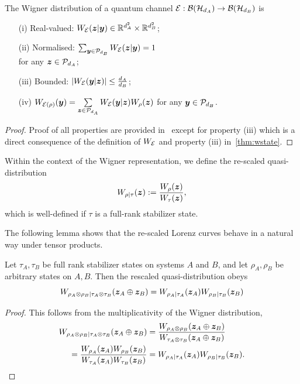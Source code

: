 \documentclass[pra,
aps,
twocolumn,
superscriptaddress,
groupedaddress,
nofootinbib,
reprint
]{revtex4-1}
\begin{document}
\begin{proposition}
    \label{thm:wchannel}
    The Wigner distribution of a quantum channel ${\mathcal E}: \mathcal{B}(\mathcal{H}_{d_A}) \rightarrow \mathcal{B}(\mathcal{H}_{d_B})$ is
    \begin{enumerate}
        \item[(i)]\label{en:wo1} Real-valued: $\W{\E}(\z|\y) \in \mathbb{R}^{d_A^2} \times \mathbb{R}^{d_B^2}$;
        \item[(ii)]\label{en:wo2} Normalised: $\sum_{\bmy \in \cal{P}_{d_B}} \W[\bmz|\bmy]{\E} = 1$ \\ 
        for any $\bm{z} \in \mathcal{P}_{d_A}$;
        \item[(iii)]\label{en:wo3} Bounded: $\abs{\W[\bmy|\bmz]{\E}} \leq \frac{d_A}{d_B}$;
	    \item[(iv)]\label{en:wo4} $\W[\bmy]{\E(\rho)} = \sum\limits_{\bmz \in \cal{P}_{d_{A}}} \W[\bmy|\bmz]{\E} \W[\bmz]{\rho}$ for any $\bm{y} \in \mathcal{P}_{d_B}$.
    \end{enumerate}
\end{proposition}
\begin{proof}
	Proof of all properties are provided in~\cite{Wang_2019} except for property (iii) which is a direct consequence of the definition of $\W{\E}$ and property (iii) in~\cref{thm:wstate}.
\end{proof}

Within the context of the Wigner representation, we define the re-scaled quasi-distribution
\begin{equation}
	W_{\rho|\tau}(\bm{z}) := \frac{W_\rho (\bm{z}) }{ W_\tau(\bm{z})},
\end{equation}
which is well-defined if $\tau$ is a full-rank stabilizer state.

The following lemma shows that the re-scaled Lorenz curves behave in a natural way under tensor products. 
\begin{proposition}\label{prop:rescaled_multi}
	Let $\tau_A, \tau_B$ be full rank stabilizer states on systems $A$ and $B$, and let $\rho_A, \rho_B$ be arbitrary states on $A,B$. Then the rescaled quasi-distribution obeys
\begin{equation}
W_{\rho_A \otimes \rho_B | \tau_A \otimes \tau_B}(\bm{z}_A \oplus \bm{z}_B) =W_{\rho_A | \tau_A}(\bm{z}_A) W_{\rho_B | \tau_B}(\bm{z}_B)
\end{equation}
\end{proposition}
\begin{proof} This follows from the multiplicativity of the Wigner distribution,
\begin{align}
W_{\rho_A \otimes \rho_B | \tau_A \otimes \tau_B}(\bm{z}_A \oplus \bm{z}_B) &= \frac{W_{\rho_A \otimes \rho_B} (\bm{z}_A \oplus \bm{z}_B)}{W_{\tau_A \otimes \tau_B} (\bm{z}_A \oplus \bm{z}_B)}\nonumber \\
 = \frac{W_{\rho_A } (\bm{z}_A )W_{\rho_B } (\bm{z}_B )}{W_{\tau_A } (\bm{z}_A )W_{\tau_B } (\bm{z}_B )} &= W_{\rho_A | \tau_A}(\bm{z}_A) W_{\rho_B | \tau_B}(\bm{z}_B). \nonumber
\end{align}
\end{proof}
\end{document}

